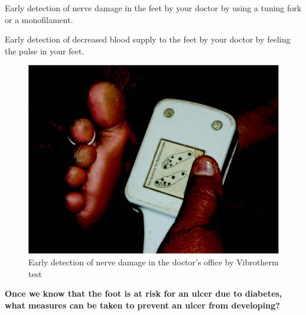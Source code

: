 { \item Early detection of nerve damage in the feet by your doctor by using a tuning fork or a monofilament.

 \item Early detection of decreased blood supply to the feet by your doctor by feeling the pulse in your feet.


\begin{figure}
\includegraphics{images/063.jpg}
\caption{Early detection of nerve damage in the doctor's office by Vibrotherm test}
\end{figure}

\textbf{Once we know that the foot is at risk for an ulcer due to diabetes, what measures can be taken to prevent an ulcer from developing?}

}
